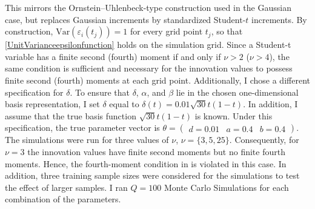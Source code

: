 \documentclass[12pt,a4paper]{article}
\theoremstyle{definition}
\begin{document}
This mirrors the Ornstein--Uhlenbeck-type construction used in the Gaussian case, but replaces Gaussian increments by standardized Student-\(t\) increments. By construction, $\mathrm{Var}\!\left(\varepsilon_i(t_j)\right)=1$ for every grid point \(t_j\), so that \cref{UnitVarianceepsilonfunction} holds on the simulation grid. Since a Student-t variable has a finite second (fourth) moment if and only if $\nu>2$ ($\nu>4$), the same condition is sufficient and necessary for the innovation values to possess finite second (fourth) moments at each grid point. Additionally, I chose a different specification for $\delta$. To ensure that $\delta$, $\alpha$, and $\beta$ lie in the chosen one-dimensional basis representation, I set $\delta$ equal to $\delta(t) =0.01\sqrt{30} t(1-t)$. In addition, I assume that the true basis function $\sqrt{30} t(1-t)$ is known. Under this specification, the true parameter vector is $\theta = \begin{pmatrix}
    d = 0.01 & a = 0.4 & b = 0.4
\end{pmatrix}$. The simulations were run for three values of $\nu$, $\nu=\{3,5,25 \}$. Consequently, for $\nu =3$ the innovation values have finite second moments but no finite fourth moments. Hence, the fourth-moment condition in  is violated in this case. In addition, three training sample sizes were considered for the simulations to test the effect of larger samples. I ran $Q=100$ Monte Carlo Simulations for each combination of the parameters.
\setlength{\tabcolsep}{5pt}
\end{document}
